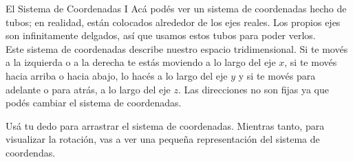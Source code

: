 \begin{surferPage}{El Sistema de Coordenadas I}
Ac{\'a} pod{\'e}s ver un sistema de coordenadas hecho de tubos; en realidad, est{\'a}n colocados alrededor de los ejes reales. Los propios ejes son infinitamente delgados, as{\'i} que usamos estos tubos para poder verlos.\\
Este sistema de coordenadas describe nuestro espacio tridimensional. Si te mov{\'e}s a la izquierda o a la derecha te est{\'a}s moviendo a lo largo del eje $x$, si te mov{\'e}s hacia arriba o hacia abajo, lo hac{\'e}s a lo largo del eje $y$ y si te mov{\'e}s para adelante o para atr{\'a}s, a lo largo del eje $z$. Las direcciones no son fijas ya que pod{\'e}s cambiar el sistema de coordenadas.

\vspace{0.3cm}
Us{\'a} tu dedo para arrastrar el sistema de coordenadas. Mientras tanto, para visualizar la rotaci{\'o}n, vas a ver una peque{\~n}a representaci{\'o}n del sistema de coordendas.
\end{surferPage}
